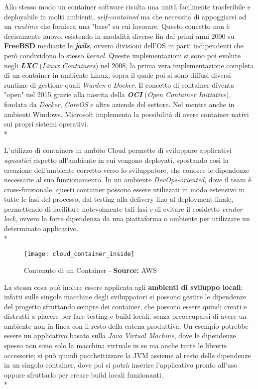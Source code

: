 \documentclass[../main.tex]{subfiles}
\begin{document}
            Allo stesso modo un container software risulta una unità facilmente trasferibile e deployabile in molti ambienti, \emph{self-contained} ma che necessita di appoggiarsi ad un \emph{runtime} che fornisca una "base" su cui lavorare. Questo concetto non è decisamente nuovo, esistendo in modalità diverse fin dai primi anni 2000 su \textbf{FreeBSD} mediante le \emph{\textbf{jails}}, ovvero divisioni dell'OS in parti indipendenti che però condividono lo stesso \emph{kernel}. Queste implementazioni si sono poi evolute negli \emph{\textbf{LXC}} (\emph{Linux Containers}) nel 2008, la prima vera implementazione completa di un container in ambiente Linux, sopra il quale poi si sono diffusi diversi runtime di gestione quali \emph{Warden} e \emph{Docker}. Il concetto di container diventa "open" nel 2015 grazie alla nascita della \emph{\textbf{OCI}} (\emph{Open Container Initiative}), fondata da \emph{Docker}, \emph{CoreOS} e altre aziende del settore. Nel mentre anche in ambienti Windows, Microsoft implementa la possibilità di avere container nativi sui propri sistemi operativi.\\*
            
            L'utilizzo di containers in ambito Cloud permette di sviluppare applicativi \emph{agnostici} rispetto all'ambiente in cui vengono deployati, spostando così la creazione dell'ambiente corretto verso lo sviluppatore, che conosce le dipendenze necessarie al suo funzionamento. In un ambiente \emph{DevOps-oriented}, dove il team è cross-funzionale, questi container possono essere utilizzati in modo estensivo in tutte le fasi del processo, dal testing alla delivery fino al deployment finale, permettendo di facilitare notevolmente tali fasi e di evitare il cosidetto \emph{vendor lock}, ovvero la forte dipendenza da una piattaforma o ambiente per utilizzare un determinato applicativo.\\*
            
            \begin{figure}[h]
    			\centering
    			\texttt{[image: cloud\_container\_inside]}
    			\caption{Contenuto di un Container - \textbf{Source:} AWS}
    			\label{fig:cloud_container_inside}
    	    \end{figure}
            
            La stessa cosa può inoltre essere applicata agli \textbf{ambienti di sviluppo locali}; infatti sulle singole macchine degli sviluppatori si possono gestire le dipendenze del progetto sfruttando sempre dei container, che possono essere quindi creati e distrutti a piacere per fare testing e build locali, senza preoccuparsi di avere un ambiente non in linea con il resto della catena produttiva. Un esempio potrebbe essere un applicativo basato sulla \emph{Java Virtual Machine}, dove le dipendenze spesso non sono solo la macchina virtuale in se ma anche tutte le librerie accessorie; si può quindi pacchettizzare la JVM assieme al resto delle dipendenze in un singolo container, dove poi si potrà inserire l'applicativo pronto all'uso oppure sfruttarlo per creare build locali funzionanti.\\*
            
\end{document}
